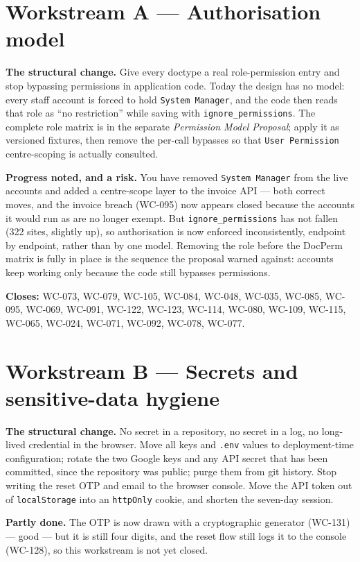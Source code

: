 \documentclass[11pt]{article}
\newcommand{\wc}[1]{\mbox{WC-#1}}
\begin{document}
\section{Workstream A --- Authorisation model}
\textbf{The structural change.} Give every doctype a real role-permission entry and stop bypassing
permissions in application code. Today the design has no model: every staff account is forced to hold
\texttt{System~Manager}, and the code then reads that role as ``no restriction'' while saving with
\texttt{ignore\_permissions}. The complete role matrix is in the separate \emph{Permission Model
Proposal}; apply it as versioned fixtures, then remove the per-call bypasses so that
\texttt{User~Permission} centre-scoping is actually consulted.

\textbf{Progress noted, and a risk.} You have removed \texttt{System~Manager} from the live accounts
and added a centre-scope layer to the invoice API --- both correct moves, and the invoice breach
(\wc{095}) now appears closed because the accounts it would run as are no longer exempt. But
\texttt{ignore\_permissions} has not fallen (322 sites, slightly up), so authorisation is now enforced
inconsistently, endpoint by endpoint, rather than by one model. Removing the role before the DocPerm
matrix is fully in place is the sequence the proposal warned against: accounts keep working only
because the code still bypasses permissions.

\textbf{Closes:} \wc{073}, \wc{079}, \wc{105}, \wc{084}, \wc{048}, \wc{035}, \wc{085}, \wc{095},
\wc{069}, \wc{091}, \wc{122}, \wc{123}, \wc{114}, \wc{080}, \wc{109}, \wc{115}, \wc{065}, \wc{024},
\wc{071}, \wc{092}, \wc{078}, \wc{077}.

\section{Workstream B --- Secrets and sensitive-data hygiene}
\textbf{The structural change.} No secret in a repository, no secret in a log, no long-lived
credential in the browser. Move all keys and \texttt{.env} values to deployment-time configuration;
rotate the two Google keys and any API secret that has been committed, since the repository was public;
purge them from git history. Stop writing the reset OTP and email to the browser console. Move the API
token out of \texttt{localStorage} into an \texttt{httpOnly} cookie, and shorten the seven-day session.

\textbf{Partly done.} The OTP is now drawn with a cryptographic generator (\wc{131}) --- good --- but it
is still four digits, and the reset flow still logs it to the console (\wc{128}), so this workstream is
not yet closed.
\end{document}
